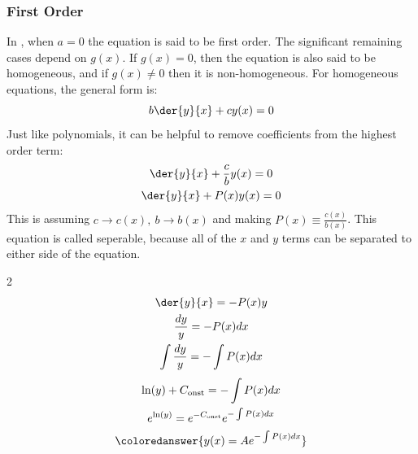     \subsubsection{First Order}
        In , when $a=0$ the equation is said to be first order. The significant remaining cases depend on $g(x)$. If $g(x)=0$, then the equation is also said to be homogeneous, and if $g(x)\neq0$ then it is non-homogeneous. For homogeneous equations, the general form is:
        \begin{equation}
            b\der{y}{x}+cy(x)=0
        \end{equation}
        Just like polynomials, it can be helpful to remove coefficients from the highest order term:
        \begin{gather*}
            \der{y}{x}+\frac{c}{b}y(x)=0
            \\
            \der{y}{x}+P(x)y(x)=0
        \end{gather*}
        This is assuming $c\rightarrow c(x),~b\rightarrow b(x)$ and making $P(x)\equiv\frac{c(x)}{b(x)}$. This equation is called seperable, because all of the $x$ and $y$ terms can be separated to either side of the equation. 
        \begin{multicols}{2}\raggedcolumns
                \begin{gather*}
                    \der{y}{x}=-P(x)y
                    \\
                    \frac{dy}{y}=- P(x)dx
                    \\
                    \int\frac{dy}{y}=-\int P(x)dx
                \end{gather*}
                \begin{gather}
                \ln(y)+C_{\text{onst}}=-\int P(x)dx \notag
                \\
                e^{\ln(y)}=e^{-C_{\text{onst}}}e^{-\int P(x)dx} \notag
                \\
                \coloredanswer{y(x)=Ae^{-\int P(x)dx}}
            \end{gather}
        \end{multicols}
    \newpage
    
    

